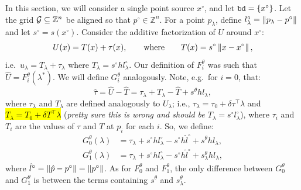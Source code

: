 \documentclass[eikonal.tex]{subfiles}
\begin{document}
In this section, we will consider a single point source $x^\circ$, and
let $\texttt{bd} = \left\{x^\circ\right\}$. Let the grid
$\mathcal{G} \subseteq \mathbb{Z}^n$ be aligned so that
$p^\circ \in \mathbb{Z}^n$. For a point $p_\lambda$, define
$l^\circ_\lambda = \left\|p_\lambda - p^\circ\right\|$ and let
$s^\circ = s(x^\circ)$. Consider the additive factorization of $U$ around $x^\circ$:
\begin{align}
  U(x) = T(x) + \tau(x), \qquad \text{where} \qquad T(x) = s^\circ \left\|x - x^\circ\right\|,
\end{align}
i.e.\ $u_\lambda = T_\lambda + \tau_\lambda$ where
$T_\lambda = s^\circ h l^\circ_\lambda$. Our definition of
$F_i^\theta$ was such that $\hat{U} = F_i^\theta(\lambda^*)$. We will
define $G_i^\theta$ analogously. Note, e.g.\ for $i = 0$, that:
\begin{equation}
  \hat{\tau} = \hat{U} - \hat{T} = \tau_\lambda + T_\lambda - \hat{T} + s^\theta h l_\lambda,
\end{equation}
where $\tau_\lambda$ and $T_\lambda$ are defined analogously to
$U_\lambda$; i.e., $\tau_\lambda = \tau_0 + \delta \tau^\top \lambda$
and \hl{$T_\lambda = T_0 + \delta T^\top \lambda$} (\emph{pretty sure
  this is wrong and should be $T_\lambda = s^\circ l^\circ_\lambda$}),
where $\tau_i$ and $T_i$ are the values of $\tau$ and $T$ at $p_i$ for
each $i$. So, we define:
\begin{align}
  \label{eq:Gi}
  G_0^\theta(\lambda) &= \tau_\lambda + s^\circ h l^\circ_\lambda - s^\circ h \hat{l}^\circ + s^\theta h l_\lambda, \\
  G_1^\theta(\lambda) &= \tau_\lambda + s^\circ h l^\circ_\lambda - s^\circ h \hat{l}^\circ + s^\theta_\lambda h l_\lambda,
\end{align}
where $\hat{l}^\circ = \left\|\hat{p} - p^\circ\right\| = \left\|p^\circ\right\|$. As
for $F_0^\theta$ and $F_1^\theta$, the only difference between
$G_0^\theta$ and $G_1^\theta$ is between the terms containing
$s^\theta$ and $s^\theta_\lambda$.
\end{document}
